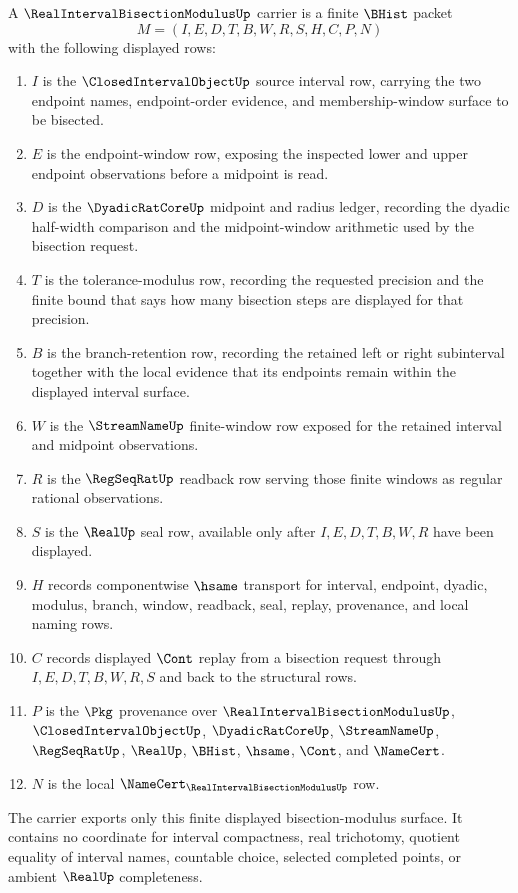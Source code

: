 \begin{definition}
\label{def:real-interval-bisection-modulus-carrier}
A $\RealIntervalBisectionModulusUp$ carrier is a finite $\BHist$ packet
$$
M=(I,E,D,T,B,W,R,S,H,C,P,N)
$$
with the following displayed rows:
\begin{enumerate}
\item $I$ is the $\ClosedIntervalObjectUp$ source interval row, carrying the two endpoint names, endpoint-order evidence, and membership-window surface to be bisected.
\item $E$ is the endpoint-window row, exposing the inspected lower and upper endpoint observations before a midpoint is read.
\item $D$ is the $\DyadicRatCoreUp$ midpoint and radius ledger, recording the dyadic half-width comparison and the midpoint-window arithmetic used by the bisection request.
\item $T$ is the tolerance-modulus row, recording the requested precision and the finite bound that says how many bisection steps are displayed for that precision.
\item $B$ is the branch-retention row, recording the retained left or right subinterval together with the local evidence that its endpoints remain within the displayed interval surface.
\item $W$ is the $\StreamNameUp$ finite-window row exposed for the retained interval and midpoint observations.
\item $R$ is the $\RegSeqRatUp$ readback row serving those finite windows as regular rational observations.
\item $S$ is the $\RealUp$ seal row, available only after $I,E,D,T,B,W,R$ have been displayed.
\item $H$ records componentwise $\hsame$ transport for interval, endpoint, dyadic, modulus, branch, window, readback, seal, replay, provenance, and local naming rows.
\item $C$ records displayed $\Cont$ replay from a bisection request through $I,E,D,T,B,W,R,S$ and back to the structural rows.
\item $P$ is the $\Pkg$ provenance over $\RealIntervalBisectionModulusUp$, $\ClosedIntervalObjectUp$, $\DyadicRatCoreUp$, $\StreamNameUp$, $\RegSeqRatUp$, $\RealUp$, $\BHist$, $\hsame$, $\Cont$, and $\NameCert$.
\item $N$ is the local $\NameCert_{\RealIntervalBisectionModulusUp}$ row.
\end{enumerate}
The carrier exports only this finite displayed bisection-modulus surface. It contains no coordinate for interval compactness, real trichotomy, quotient equality of interval names, countable choice, selected completed points, or ambient $\RealUp$ completeness.
\end{definition}

